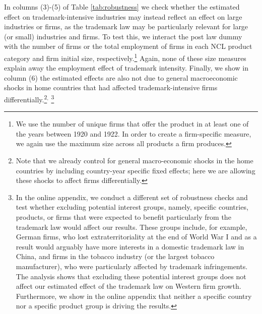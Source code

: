 \documentclass[12pt]{article}
\begin{document}
In columns (3)-(5) of Table \ref{tab:robustness} we check whether the estimated effect on trademark-intensive industries may instead reflect  an effect on large industries or firms, as the trademark law may be particularly relevant for large (or small) industries and firms. To test this, we interact the post law dummy with the number of firms or the total employment of firms in each NCL product category and firm initial size, respectively.\footnote{We use the number of unique firms that offer the product in at least one of the years between 1920 and 1922. In order to create a firm-specific measure, we again use the maximum size across all products a firm produces.} Again, none of these size measures explain away the employment effect of trademark intensity. Finally, we show in column (6) the estimated effects are also not due to general macroeconomic shocks in home countries that had affected trademark-intensive firms differentially.\footnote{Note that we already control for general macro-economic shocks in the home countries by including country-year specific fixed effects; here we are allowing these shocks to affect firms differentially.}$^{,}$ \footnote{In the online appendix, we conduct a different set of robustness checks and test whether excluding potential interest groups, namely, specific countries, products, or firms that were expected to benefit particularly from the trademark law would affect our results. These groups include, for example, German firms, who lost extraterritoriality at the end of World War I and as a result would arguably have more interests in a domestic trademark law in China, and firms in the tobacco industry (or the largest tobacco manufacturer), who were particularly affected by trademark infringements.  The analysis shows that excluding these potential interest groups does not affect our estimated effect of the trademark law on Western firm growth.  Furthermore, we show in the online appendix that neither a specific country nor a specific product group is driving the results.} 

\end{document}
